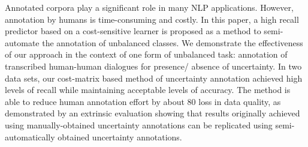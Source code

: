 Annotated corpora play a significant role in many NLP applications. However, annotation
 by humans is time-consuming and costly.
 In this paper, a high recall predictor based
 on a cost-sensitive learner is proposed as a
 method to semi-automate the annotation of
 unbalanced classes. We demonstrate the effectiveness
 of our approach in the context of
 one form of unbalanced task: annotation of
 transcribed human-human dialogues for presence/
 absence of uncertainty. In two data
 sets, our cost-matrix based method of uncertainty
 annotation achieved high levels of recall
 while maintaining acceptable levels of accuracy.
 The method is able to reduce human
 annotation effort by about 80%
 loss in data quality, as demonstrated
 by an extrinsic evaluation showing that results
 originally achieved using manually-obtained
 uncertainty annotations can be replicated using
 semi-automatically obtained uncertainty
 annotations.

